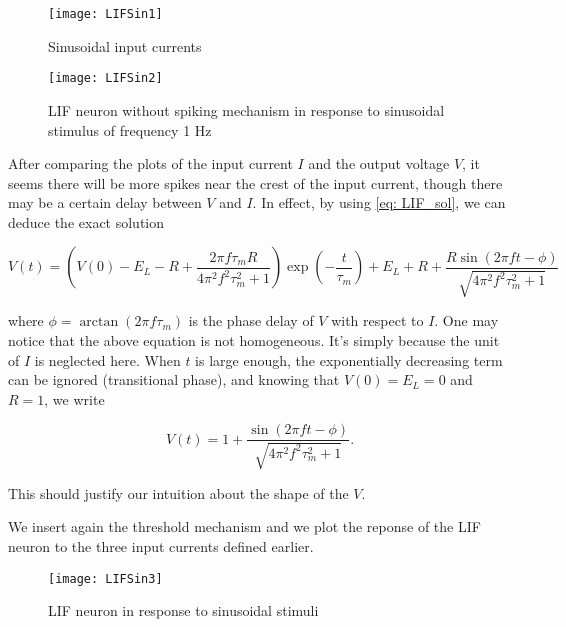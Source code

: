 \vspace{-1em}
\begin{figure}[H]
  \centering
  \texttt{[image: LIFSin1]}
  \caption{Sinusoidal input currents}
  \label{fig: sin_I}
\end{figure}

\vspace{-1em}
\begin{figure}[H]
  \centering
  \texttt{[image: LIFSin2]}
  \caption{LIF neuron without spiking mechanism in response to 
           sinusoidal stimulus of frequency 1 Hz}
  \label{fig: LIF_sin}
\end{figure}

After comparing the plots of the input current $I$ and the output voltage $V$,
it seems there will be more spikes near the crest of the input current, 
though there may be a certain delay between $V$ and $I$. In effect, by using
\eqref{eq: LIF_sol}, we can deduce the exact solution 

\begin{equation}
  \label{eq: LIF_sin_sol}
  V(t) = (V(0) -E_L - R + \frac{2\pi f\tau_mR}{4\pi^2f^2\tau_m^2 + 1})
         \exp(-\frac{t}{\tau_m}) + E_L + R
         + \frac{R\sin(2\pi ft-\phi)}{\sqrt{4\pi^2f^2\tau_m^2+1}}
\end{equation}

\noindent
where $\phi = \arctan(2\pi f\tau_m)$ is the phase delay of $V$ with respect
to $I$. One may notice that the above equation is not homogeneous. 
It's simply because the unit of $I$ is neglected here. When $t$ is large 
enough, the exponentially decreasing term can be ignored (transitional phase),
and knowing that $V(0) = E_L = 0$ and $R = 1$, we write

\begin{equation}
  V(t) = 1 + \frac{\sin(2\pi ft-\phi)}{\sqrt{4\pi^2f^2\tau_m^2+1}}.
\end{equation}

\noindent
This should justify our intuition about the shape of the $V$.

We insert again the threshold mechanism and we plot the reponse of the LIF
neuron to the three input currents defined earlier.

\vspace{-1em}
\begin{figure}[H]
  \centering
  \texttt{[image: LIFSin3]}
  \caption{LIF neuron in response to sinusoidal stimuli}
\end{figure}

